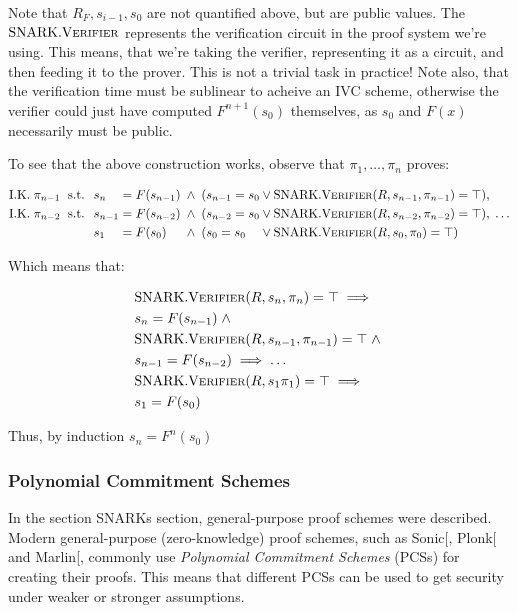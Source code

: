 \documentclass[
]{article}
\newcommand*{\Verifier}{\mathrm{\text{V\scriptsize ERIFIER}}}
\newcommand*{\SNARKVerifier}{\mathrm{\text{SNARK}}.\Verifier}
\begin{document}
Note that \(R_F, s_{i-1}, s_0\) are not quantified above, but are public
values. The \(\SNARKVerifier\) represents the verification circuit in
the proof system we're using. This means, that we're taking the
verifier, representing it as a circuit, and then feeding it to the
prover. This is not a trivial task in practice! Note also, that the
verification time must be sublinear to acheive an IVC scheme, otherwise
the verifier could just have computed \(F^{n+1}(s_0)\) themselves, as
\(s_0\) and \(F(x)\) necessarily must be public.

To see that the above construction works, observe that \(\pi_1, \dots,
\pi_n\) proves:

\[
\begin{alignedat}{7}
  &\text{I.K.} \; \pi_{n-1} \; &&\text{ s.t. } \; &&s_n     &&= F(s_{n-1}) \; &&\land \; (s_{n-1} = s_0  &&\lor \SNARKVerifier(R, s_{n-1}, \pi_{n-1}) = \top), \\
  &\text{I.K.} \; \pi_{n-2} \; &&\text{ s.t. } \; &&s_{n-1} &&= F(s_{n-2}) \; &&\land \; (s_{n-2} = s_0  &&\lor \SNARKVerifier(R, s_{n-2}, \pi_{n-2}) = \top), \; \dots \\
  &                            &&              \; &&s_1     &&= F(s_0)     \; &&\land \; (s_0 = s_0      &&\lor \SNARKVerifier(R, s_0, \pi_0) = \top)
\end{alignedat}
\]

Which means that:

\[
\begin{alignedat}{4}
  &\SNARKVerifier(R, s_n, \pi_n) = \top \implies \\
  &s_n = F(s_{n-1}) \; \land \; \\
  &\SNARKVerifier(R, s_{n-1}, \pi_{n-1}) = \top \; \land \; \\
  &s_{n-1} = F(s_{n-2}) \implies \dots \\
  &\SNARKVerifier(R, s_1 \pi_1) = \top \implies \\
  &s_1 = F(s_0)
\end{alignedat}
\]

Thus, by induction \(s_n = F^n(s_0)\)

\subsubsection{Polynomial Commitment
Schemes}\label{polynomial-commitment-schemes}

In the section SNARKs section, general-purpose proof schemes were
described. Modern general-purpose (zero-knowledge) proof schemes, such
as Sonic{[}\citeproc{ref-sonic}{Maller et al. 2019}{]},
Plonk{[}\citeproc{ref-plonk}{Gabizon et al. 2019}{]} and
Marlin{[}\citeproc{ref-marlin}{Chiesa et al. 2019}{]}, commonly use
\emph{Polynomial Commitment Schemes} (PCSs) for creating their proofs.
This means that different PCSs can be used to get security under weaker
or stronger assumptions.
\end{document}
